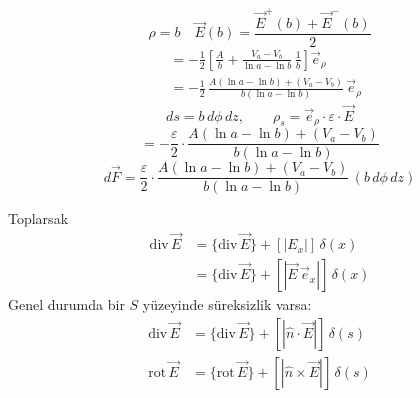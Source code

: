 \documentclass[11pt,a4paper]{article}
\begin{document}
\[ \rho=b\quad \vec E(b)=\frac{\vec E^{+}(b)+\vec E^{-}(b)}{2} \]
\begin{align*}
&=-\frac12\left[\frac{A}{b}+\frac{V_a-V_b}{\ln a-\ln b}\,\frac1b\right]\vec e_\rho\\
&=-\frac12\,\frac{A(\ln a-\ln b)+(V_a-V_b)}{b(\ln a-\ln b)}\,\vec e_\rho
\end{align*}
\[ ds=b\,d\phi\,dz,\qquad \rho_s=\vec e_\rho\cdot\varepsilon\cdot\vec E \]
\[ =-\frac{\varepsilon}{2}\cdot\frac{A(\ln a-\ln b)+(V_a-V_b)}{b(\ln a-\ln b)} \]
\[ d\vec F=\frac{\varepsilon}{2}\cdot\frac{A(\ln a-\ln b)+(V_a-V_b)}{b(\ln a-\ln b)}\,(b\,d\phi\,dz) \]

Toplarsak
\begin{align*}
\mathrm{div}\,\vec E&=\{\mathrm{div}\,\vec E\}+[|E_x|]\,\delta(x)\\
&=\{\mathrm{div}\,\vec E\}+[|\vec E\,\vec e_x|]\,\delta(x)
\end{align*}
Genel durumda bir $S$ yüzeyinde süreksizlik varsa:
\begin{align*}
\mathrm{div}\,\vec E&=\{\mathrm{div}\,\vec E\}+[|\hat n\cdot\vec E|]\,\delta(s)\\
\mathrm{rot}\,\vec E&=\{\mathrm{rot}\,\vec E\}+[|\hat n\times\vec E|]\,\delta(s)
\end{align*}
\end{document}
